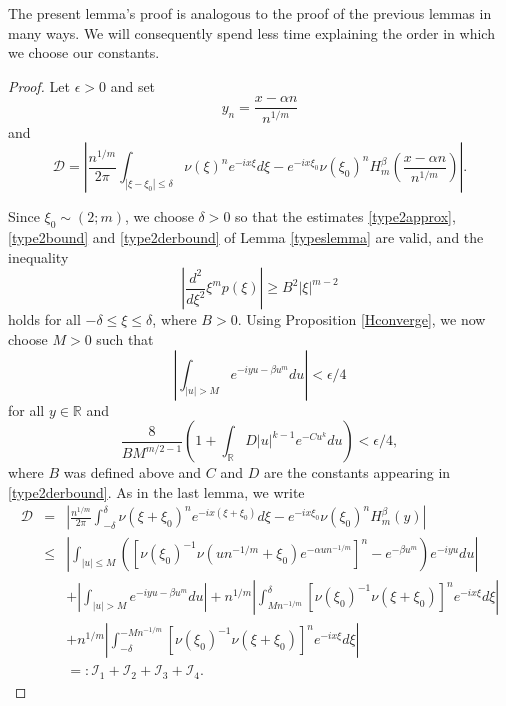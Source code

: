 \documentclass{article}
\theoremstyle{theorem}
\theoremstyle{remark}
\begin{document}
\noindent The present lemma's proof is analogous to the proof of the previous lemmas in many ways. We will consequently spend less time explaining the order in which we choose our constants.
\begin{proof}
Let $\epsilon>0$ and set
\begin{equation}
 y_n=\frac{x-\alpha n}{n^{1/m}}
\end{equation}
and 
\begin{equation*}
 \mathcal{D}=\left|\frac{n^{1/m}}{2\pi}\int_{|\xi-\xi_0|\leq\delta}\nu(\xi)^n
e^{-ix\xi}d\xi-e^{-ix\xi_0}\nu(\xi_0)^n H_{m}^{\beta}\left(\frac{x-\alpha
n}{n^{1/m}}\right)\right|.
\end{equation*}

Since $\xi_0\sim(2;m)$, we choose $\delta>0$ so that the estimates \eqref{type2approx}, \eqref{type2bound} and \eqref{type2derbound} of Lemma \ref{typeslemma} are valid, and the inequality
\begin{equation}\label{inf2m}
 \left|\frac{d^2}{d\xi^2}\xi^m p(\xi)\right|\geq B^2|\xi|^{m-2}
\end{equation}
holds for all $-\delta\leq\xi\leq\delta$, where $B>0$. Using Proposition \ref{Hconverge}, we now choose $M>0$ such that
\begin{equation}\label{tail2m}
\left|\int_{|u|>M}e^{-iyu-\beta u^m}du\right|<\epsilon/4
\end{equation}
for all $y\in\mathbb{R}$ and
\begin{equation}
 \frac{8}{BM^{m/2-1}}\left(1+\int_{\mathbb{R}}D|u|^{k-1}e^{-Cu^k}du\right)<\epsilon/4,
\end{equation}
where $B$ was defined above and $C$ and $D$ are the constants appearing in \eqref{type2derbound}. As in the last lemma, we write
\begin{eqnarray*}
\mathcal{D}&=&\left|\frac{n^{1/m}}{2\pi}\int_{-\delta}^{\delta}\nu(\xi+\xi_0)^n
e^{-ix(\xi+\xi_0)}d\xi-e^{-ix\xi_0}\nu(\xi_0)^n H_{m}^{\beta}(y)\right|\\
&\leq& \left|\int_{|u|\leq M}\left([\nu(\xi_0)^{-1}\nu(un^{-1/m}+\xi_0)e^{-\alpha un^{-1/m}}]^n-e^{-\beta u^m}\right)e^{-iyu}du\right|\\
&&+\left|\int_{|u|>M}e^{-iyu-\beta u^m}du\right|+n^{1/m}\left|\int_{Mn^{-1/m}}^{\delta}[\nu(\xi_0)^{-1}\nu(\xi+\xi_0)]^n
e^{-ix\xi}d\xi\right|\\
&&+n^{1/m}\left|\int_{-\delta}^{-Mn^{-1/m}}[\nu(\xi_0)^{-1}\nu(\xi+\xi_0)]^n
e^{-ix\xi}d\xi\right|\\
&&=:\mathcal{I}_1+\mathcal{I}_2+\mathcal{I}_3+\mathcal{I}_4.

\end{eqnarray*}
\end{proof}
\end{document}
